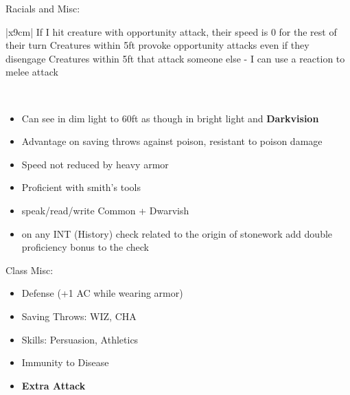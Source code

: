 \documentclass[12pt, xcolor={dvipsnames}]{beamer}
\newcommand{\tn}{\tabularnewline\hline}
\newcommand{\wiz}{{\color{red}WIZ}}
\newcommand{\inte}{{\color{red}INT}}
\newcommand{\cha}{{\color{red}CHA}}
\begin{document}
\begin{frame}
  \tiny
  Racials and Misc:\\ \vspace{1em}

  \begin{tabular}{|x{9cm}|} \hline
    \tn
    If I hit creature with opportunity attack, their speed is 0 for the rest of their turn\tn
    Creatures within 5ft provoke opportunity attacks even if they disengage\tn
    Creatures within 5ft that attack someone else - I can use a reaction to melee attack\tn
  \end{tabular}\\ \vspace{1em}

  \begin{itemize}
  \small

  \item Can see in dim light to 60ft as though in bright light
    and \textbf{\color{DarkOrchid}Darkvision}

  \item Advantage on saving throws against poison, resistant to poison damage

  \item Speed not reduced by heavy armor

  \item Proficient with smith's tools

  \item speak/read/write Common + Dwarvish

  \item on any {\inte} (History) check related to the origin of stonework
    add double proficiency bonus to the check
\end{itemize}
\end{frame}

\begin{frame}
  Class Misc:
  \begin{itemize}
    \item Defense (+1 AC while wearing armor)

    \item Saving Throws:  {\wiz}, {\cha}

    \item Skills: Persuasion, Athletics

    \item Immunity to Disease

    \item \textbf{Extra Attack}
  \end{itemize}
\end{frame}
\end{document}
